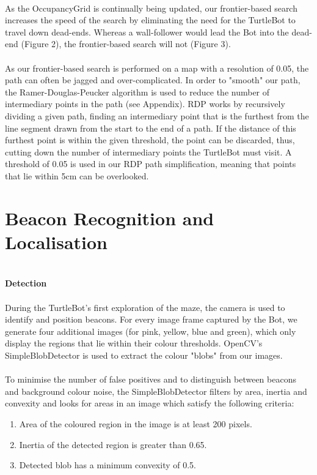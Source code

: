\documentclass[titlepage,12pt,a4paper]{article}
\begin{document}
\pagebreak

\noindent 
\\
As the OccupancyGrid is continually being updated, our frontier-based search increases the speed of the search by eliminating the need for the TurtleBot to travel down dead-ends. Whereas a wall-follower would lead the Bot into the dead-end (Figure 2), the frontier-based search will not (Figure 3).\\
\\
As our frontier-based search is performed on a map with a resolution of 0.05, the path can often be jagged and over-complicated. In order to "smooth" our path, the Ramer-Douglas-Peucker algorithm is used to reduce the number of intermediary points in the path (see Appendix). RDP works by recursively dividing a given path, finding an intermediary point that is the furthest from the line segment drawn from the start to the end of a path. If the distance of this furthest point is within the given threshold, the point can be discarded, thus, cutting down the number of intermediary points the TurtleBot must visit. A threshold of 0.05 is used in our RDP path simplification, meaning that points that lie within 5cm can be overlooked.\\


\pagebreak


\section*{Beacon Recognition and Localisation}

\large{\textbf{\\Detection}} \\
\normalsize
\\
During the TurtleBot's first exploration of the maze, the camera is used to identify and position beacons. For every image frame captured by the Bot, we generate four additional images (for pink, yellow, blue and green), which only display the regions that lie within their colour thresholds. OpenCV's SimpleBlobDetector is used to extract the colour "blobs" from our images.\\
\\
To minimise the number of false positives and to distinguish between beacons and background colour noise, the SimpleBlobDetector filters by area, inertia and convexity and looks for areas in an image which satisfy the following criteria:

	\begin{enumerate}
		\item Area of the coloured region in the image is at least 200 pixels.
		\item Inertia of the detected region is greater than 0.65.
		\item Detected blob has a minimum convexity of 0.5.\\
	\end{enumerate}
\end{document}

